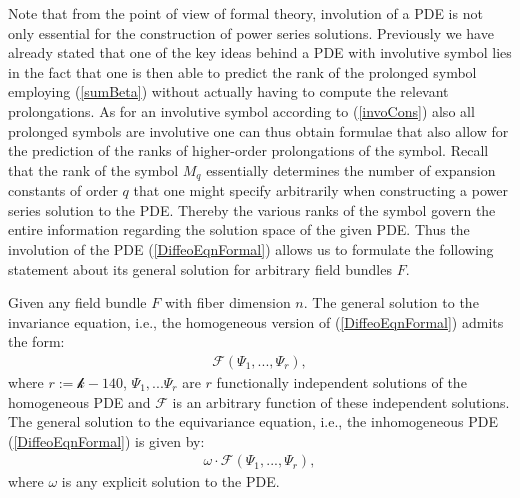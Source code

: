 Note that from the point of view of formal theory, involution of a PDE is not only essential for the construction of power series solutions. Previously we have already stated that one of the key ideas behind a PDE with involutive symbol lies in the fact that one is then able to predict the rank of the prolonged symbol employing (\ref{sumBeta}) without actually having to compute the relevant prolongations. As for an involutive symbol according to (\ref{invoCons}) also all prolonged symbols are involutive one can thus obtain formulae that also allow for the prediction of the ranks of higher-order prolongations of the symbol. Recall that the rank of the symbol $M_q$ essentially determines the number of expansion constants of order $q$ that one might specify arbitrarily when constructing a power series solution to the PDE. Thereby the various ranks of the symbol govern the entire information regarding the solution space of the given PDE.
Thus the involution of the PDE (\ref{DiffeoEqnFormal}) allows us to formulate the following statement about its general solution for arbitrary field bundles $F$.
\begin{theorem}\label{GeneralSol}
Given any field bundle $F$ with fiber dimension $n$. The general solution to the invariance equation, i.e., the homogeneous version of (\ref{DiffeoEqnFormal}) admits the form:
\begin{align}
    \mathcal{F} \left (\Psi_1,...,\Psi_r \right ),
\end{align}
where $r:=\mathcal{k}-140$, $\Psi_1,...\Psi_r$ are $r$ functionally independent solutions of the homogeneous PDE and $\mathcal{F}$ is an arbitrary function of these independent solutions. The general solution to the equivariance equation, i.e., the inhomogeneous PDE (\ref{DiffeoEqnFormal}) is given by:
\begin{align}
    \omega \cdot \mathcal{F} \left (\Psi_1,...,\Psi_r \right ),
\end{align}
where $\omega$ is any explicit solution to the PDE. 
\end{theorem}
